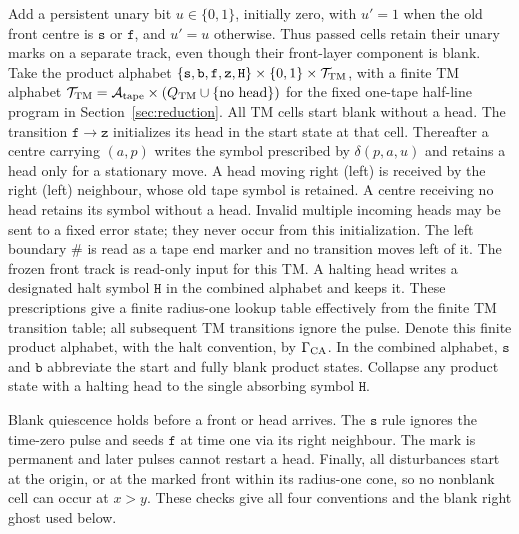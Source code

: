 Add a persistent unary bit $u\in\{0,1\}$, initially zero, with $u'=1$ when the old front centre is $\mathtt s$ or $\mathtt f$, and $u'=u$ otherwise. Thus passed cells retain their unary marks on a separate track, even though their front-layer component is blank. Take the product alphabet $\{\mathtt s,\mathtt b,\mathtt f,\mathtt z,\mathtt H\}\times\{0,1\}\times\mathcal T_{\rm TM}$, with a finite TM alphabet $\mathcal T_{\rm TM}=\mathcal A_{\rm tape}\times(Q_{\rm TM}\cup\{\mathrm{no\ head}\})$ for the fixed one-tape half-line program in Section~\ref{sec:reduction}. All TM cells start blank without a head. The transition $\mathtt f\to \mathtt z$ initializes its head in the start state at that cell. Thereafter a centre carrying $(a,p)$ writes the symbol prescribed by $\delta(p,a,u)$ and retains a head only for a stationary move. A head moving right (left) is received by the right (left) neighbour, whose old tape symbol is retained. A centre receiving no head retains its symbol without a head. Invalid multiple incoming heads may be sent to a fixed error state; they never occur from this initialization. The left boundary $\#$ is read as a tape end marker and no transition moves left of it. The frozen front track is read-only input for this TM. A halting head writes a designated halt symbol $\mathtt H$ in the combined alphabet and keeps it. These prescriptions give a finite radius-one lookup table effectively from the finite TM transition table; all subsequent TM transitions ignore the pulse. Denote this finite product alphabet, with the halt convention, by $\Gamma_{\rm CA}$. In the combined alphabet, $\mathtt s$ and $\mathtt b$ abbreviate the start and fully blank product states. Collapse any product state with a halting head to the single absorbing symbol $\mathtt H$.

Blank quiescence holds before a front or head arrives. The $\mathtt s$ rule ignores the time-zero pulse and seeds $\mathtt f$ at time one via its right neighbour. The mark is permanent and later pulses cannot restart a head. Finally, all disturbances start at the origin, or at the marked front within its radius-one cone, so no nonblank cell can occur at $x>y$. These checks give all four conventions and the blank right ghost used below.

